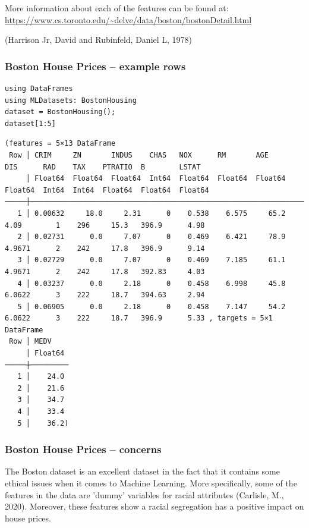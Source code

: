 \documentclass[10pt]{beamer}
\begin{document}
More information about each of the features can be found at: \url{https://www.cs.toronto.edu/\~delve/data/boston/bostonDetail.html}

(Harrison Jr, David and Rubinfeld, Daniel L, 1978)

\subsubsection*{Boston House Prices -- example rows}
\label{sec:org1c7d1a7}

\begin{verbatim}
using DataFrames
using MLDatasets: BostonHousing
dataset = BostonHousing();
dataset[1:5]
\end{verbatim}

\begin{verbatim}
(features = 5×13 DataFrame
 Row │ CRIM     ZN       INDUS    CHAS   NOX      RM       AGE      DIS      RAD    TAX    PTRATIO  B        LSTAT   
     │ Float64  Float64  Float64  Int64  Float64  Float64  Float64  Float64  Int64  Int64  Float64  Float64  Float64 
─────┼────────────────────────────────────────────────────────────────────────────────────────────────────────────────
   1 │ 0.00632     18.0     2.31      0    0.538    6.575     65.2   4.09        1    296     15.3   396.9      4.98 
   2 │ 0.02731      0.0     7.07      0    0.469    6.421     78.9   4.9671      2    242     17.8   396.9      9.14
   3 │ 0.02729      0.0     7.07      0    0.469    7.185     61.1   4.9671      2    242     17.8   392.83     4.03
   4 │ 0.03237      0.0     2.18      0    0.458    6.998     45.8   6.0622      3    222     18.7   394.63     2.94
   5 │ 0.06905      0.0     2.18      0    0.458    7.147     54.2   6.0622      3    222     18.7   396.9      5.33 , targets = 5×1 DataFrame
 Row │ MEDV
     │ Float64
─────┼─────────
   1 │    24.0
   2 │    21.6
   3 │    34.7
   4 │    33.4
   5 │    36.2)
\end{verbatim}

\subsubsection*{Boston House Prices -- concerns}
\label{sec:org5ca6798}

The Boston dataset is an excellent dataset in the fact that it contains some ethical
issues when it comes to Machine Learning. More specifically, some of the features in
the data are 'dummy' variables for racial attributes (Carlisle, M., 2020). Moreover, these features show a
racial segregation has a positive impact on house prices.
\end{document}
